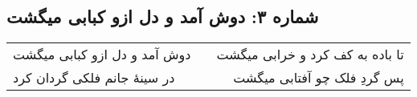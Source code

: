 \begin{center}
\section*{شماره ۳: دوش آمد و دل ازو کبابی میگشت}
\label{sec:003}
\begin{longtable}{l p{0.5cm} r}
دوش آمد و دل ازو کبابی میگشت
&&
تا باده به کف کرد و خرابی میگشت
\\
در سینهٔ جانم فلکی گردان کرد
&&
پس گردِ فلک چو آفتابی میگشت
\\
\end{longtable}
\end{center}
